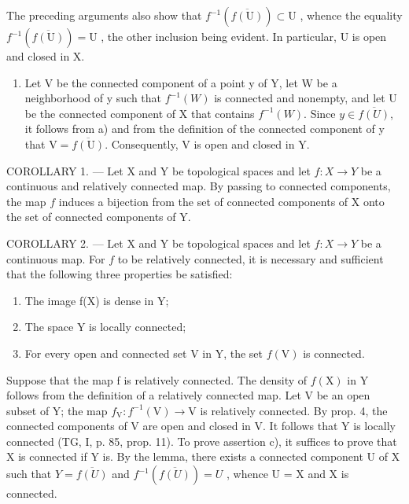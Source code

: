 The preceding arguments also show that \(f^{-1}(\overline{f(\mathrm{U})}) \subset \mathrm{U}\) , whence the equality \(f^{-1}(\overline{f(\mathrm{U})}) = \mathrm{U}\) , the other inclusion being evident. In particular, U is open and closed in X.

\begin{enumerate}
\def\labelenumi{\alph{enumi})}
\setcounter{enumi}{1}
\tightlist
\item
Let V be the connected component of a point y of Y, let W be a neighborhood of y such that \(f^{-1}(W)\) is connected and nonempty, and let U be the connected component of X that contains \(f^{-1}(W)\). Since \(y \in \overline{f(U)}\), it follows from a) and from the definition of the connected component of y that \(\mathrm{V} = \overline{f(\mathrm{U})}\). Consequently, V is open and closed in Y.
\end{enumerate}

COROLLARY 1. --- Let X and Y be topological spaces and let \(f: X \to Y\) be a continuous and relatively connected map. By passing to connected components, the map \(f\) induces a bijection from the set of connected components of X onto the set of connected components of Y.

COROLLARY 2. --- Let X and Y be topological spaces and let \(f: X \to Y\) be a continuous map. For \(f\) to be relatively connected, it is necessary and sufficient that the following three properties be satisfied:

\begin{enumerate}
\def\labelenumi{\alph{enumi})}
\item
  The image f(X) is dense in Y;
\item
  The space Y is locally connected;
\item
  For every open and connected set V in Y, the set \(f(\mathrm{V})\) is connected.
\end{enumerate}

Suppose that the map f is relatively connected. The density of \(f(\mathrm{X})\) in Y follows from the definition of a relatively connected map. Let V be an open subset of Y; the map \(f_{\mathrm{V}}: f^{-1}(\mathrm{V}) \to \mathrm{V}\) is relatively connected. By prop. 4, the connected components of V are open and closed in V. It follows that Y is locally connected (TG, I, p. 85, prop. 11). To prove assertion c), it suffices to prove that X is connected if Y is. By the lemma, there exists a connected component U of X such that \(Y = \overline{f(U)}\) and \(f^{-1}(\overline{f(U)}) = U\) , whence U = X and X is connected.

